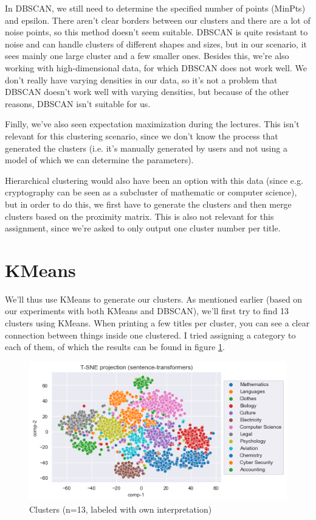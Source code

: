 \documentclass{article}
\begin{document}
In DBSCAN, we still need to determine the specified number of points (MinPts) and epsilon. There aren't clear borders between our clusters and there are a lot of noise points, so this method doesn't seem suitable. DBSCAN is quite resistant to noise and can handle clusters of different shapes and sizes, but in our scenario, it sees mainly one large cluster and a few smaller ones. Besides this, we're also working with high-dimensional data, for which DBSCAN does not work well. We don't really have varying densities in our data, so it's not a problem that DBSCAN doesn't work well with varying densities, but because of the other reasons, DBSCAN isn't suitable for us.

Finlly, we've also seen expectation maximization during the lectures. This isn't relevant for this clustering scenario, since we don't know the process that generated the clusters (i.e. it's manually generated by users and not using a model of which we can determine the parameters).

Hierarchical clustering would also have been an option with this data (since e.g. cryptography can be seen as a subcluster of mathematic or computer science), but in order to do this, we first have to generate the clusters and then merge clusters based on the proximity matrix. This is also not relevant for this assignment, since we're asked to only output one cluster number per title.

\section{KMeans}
We'll thus use KMeans to generate our clusters. As mentioned earlier (based on our experiments with both KMeans and DBSCAN), we'll first try to find 13 clusters using KMeans. When printing a few titles per cluster, you can see a clear connection between things inside one clustered. I tried assigning a category to each of them, of which the results can be found in figure \ref{fig:clusters13}.

\begin{figure}[h!]
\centering
\includegraphics[width=150mm]{clusters-labeled-13.png}
\caption{Clusters (n=13, labeled with own interpretation)}
\label{fig:clusters13}
\end{figure}
\end{document}

